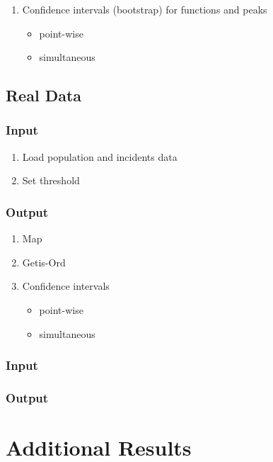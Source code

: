 \begin{singlespace*}
\begin{enumerate}
\item Confidence intervals (bootstrap) for functions and peaks
    \begin{itemize}
    \item point-wise
    \item simultaneous
    \end{itemize}
\end{enumerate}

\subsection{Real Data}

\subsubsection{Input}

\begin{enumerate}
\item Load population and incidents data
\item Set threshold
\end{enumerate}

\subsubsection{Output}
\begin{enumerate}
\item Map
\item Getis-Ord
\item Confidence intervals
    \begin{itemize}
    \item point-wise
    \item simultaneous
    \end{itemize}
\end{enumerate}

\subsubsection{Input}

\subsubsection{Output}

\section{Additional Results}


\end{singlespace*}
